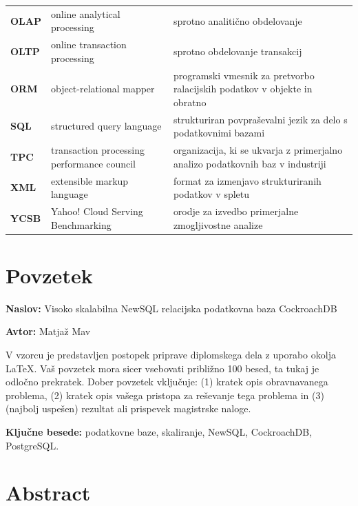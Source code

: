 \documentclass[a4paper, 12pt]{book}
\newcommand{\ttitle}{Visoko skalabilna NewSQL relacijska podatkovna baza CockroachDB}
\newcommand{\tauthor}{Matjaž Mav}
\newcommand{\tkeywords}{podatkovne baze, skaliranje, NewSQL, CockroachDB, PostgreSQL}
\newcommand{\clearemptydoublepage}{\newpage{\pagestyle{empty}\cleardoublepage}}
\begin{document}
\begin{longtable}{p{}|p{}|p{}}
    {\bf OLAP}  & online analytical processing
        & sprotno analitično obdelovanje
        \\
    {\bf OLTP}  & online transaction processing
        & sprotno obdelovanje transakcij
        \\
    {\bf ORM}   & object-relational mapper
        & programski vmesnik za pretvorbo ralacijskih podatkov v objekte in obratno
        \\
    {\bf SQL}   & structured query language    
        & strukturiran povpraševalni jezik za delo s podatkovnimi bazami
        \\
    {\bf TPC}   & transaction processing performance council
        &  organizacija, ki se ukvarja z primerjalno analizo podatkovnih baz v industriji
        \\
    {\bf XML}   & extensible markup language
        & format za izmenjavo strukturiranih podatkov v spletu
        \\
    {\bf YCSB}  & Yahoo! Cloud Serving Benchmarking
        & orodje za izvedbo primerjalne zmogljivostne analize
        \\
\end{longtable}


\clearemptydoublepage

\chapter*{Povzetek}

\noindent\textbf{Naslov:} \ttitle
\bigskip

\noindent\textbf{Avtor:} \tauthor
\bigskip

\noindent V vzorcu je predstavljen postopek priprave diplomskega dela z uporabo okolja \LaTeX. Vaš povzetek mora sicer vsebovati približno 100 besed, ta tukaj je odločno prekratek.
Dober povzetek vključuje: (1) kratek opis obravnavanega problema, (2) kratek opis vašega pristopa za reševanje tega problema in (3) (najbolj uspešen) rezultat ali prispevek magistrske naloge.

\bigskip

\noindent\textbf{Ključne besede:} \tkeywords.
\clearemptydoublepage

\chapter*{Abstract}
\end{document}
